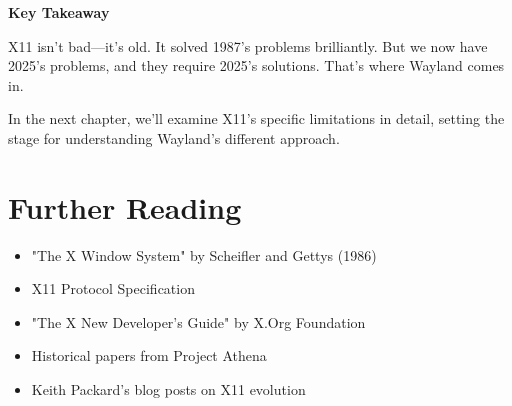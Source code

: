 \begin{notebox}
\textbf{Key Takeaway}

X11 isn't bad—it's old. It solved 1987's problems brilliantly. But we now have 2025's problems, and they require 2025's solutions. That's where Wayland comes in.
\end{notebox}

In the next chapter, we'll examine X11's specific limitations in detail, setting the stage for understanding Wayland's different approach.

\section{Further Reading}

\begin{itemize}[leftmargin=*]
    \item "The X Window System" by Scheifler and Gettys (1986)
    \item X11 Protocol Specification
    \item "The X New Developer's Guide" by X.Org Foundation
    \item Historical papers from Project Athena
    \item Keith Packard's blog posts on X11 evolution
\end{itemize}
